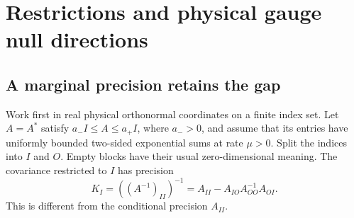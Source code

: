 \documentclass[11pt,letterpaper,reqno]{amsart}
\numberwithin{equation}{section}
\theoremstyle{definition}
\theoremstyle{remark}
\begin{document}
\section{Restrictions and physical gauge null directions}\label{mb:finite-window}

\subsection{A marginal precision retains the gap}

Work first in real physical orthonormal coordinates on a finite
index set. Let $A=A^*$ satisfy $a_-I\le A\le a_+I$, where
$a_->0$, and assume that its entries have uniformly bounded
two-sided exponential sums at rate $\mu>0$. Split the indices
into $I$ and $O$. Empty blocks have their usual zero-dimensional
meaning. The covariance restricted to $I$ has precision
\begin{equation}\label{mb:marginal-schur}
 K_I=((A^{-1})_{II})^{-1}
       =A_{II}-A_{IO}A_{OO}^{-1}A_{OI}.
\end{equation}
This is different from the conditional precision $A_{II}$.
\end{document}

